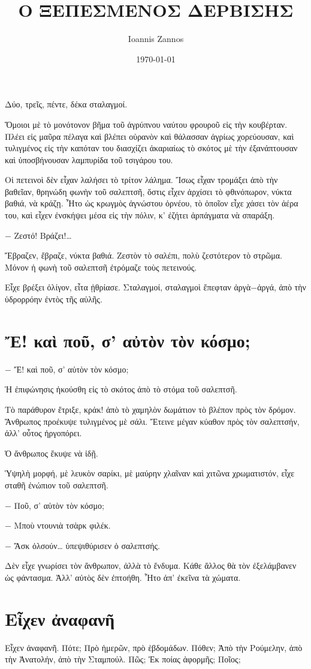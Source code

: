 \documentclass[11pt]{article}
\author{Ioannis Zannos}
\date{\today}
\title{Ο ΞΕΠΕΣΜΕΝΟΣ ΔΕΡΒΙΣΗΣ}
\begin{document}
\maketitle
\tableofcontents

Δύο, τρεῖς, πέντε, δέκα σταλαγμοί.

Ὅμοιοι μὲ τὸ μονότονον βῆμα τοῦ ἀγρύπνου ναύτου φρουροῦ εἰς τὴν κουβέρταν. Πλέει εἰς μαῦρα πέλαγα καὶ βλέπει οὐρανὸν καὶ θάλασσαν ἀγρίως χορεύουσαν, καὶ τυλιγμένος εἰς τὴν καπόταν του διασχίζει ἀκαριαίως τὸ σκότος μὲ τὴν ἐξανάπτουσαν καὶ ὑποσβήνουσαν λαμπυρίδα τοῦ τσιγάρου του.

Οἱ πετεινοὶ δὲν εἶχαν λαλήσει τὸ τρίτον λάλημα. Ἴσως εἶχαν τρομάξει ἀπὸ τὴν βαθεῖαν, θρηνώδη φωνὴν τοῦ σαλεπτσῆ, ὅστις εἶχεν ἀρχίσει τὸ φθινόπωρον, νύκτα βαθιά, νὰ κράζῃ. Ἦτο ὡς κρωγμὸς ἀγνώστου ὀρνέου, τὸ ὁποῖον εἶχε χάσει τὸν ἀέρα του, καὶ εἶχεν ἐνσκήψει μέσα εἰς τὴν πόλιν, κ' ἐζήτει ἁρπάγματα νὰ σπαράξη.

− Ζεστό! Βράζει!…

Ἔβραζεν, ἔβραζε, νύκτα βαθιά. Ζεστὸν τὸ σαλέπι, πολὺ ζεστότερον τὸ στρῶμα. Μόνον ἡ φωνὴ τοῦ σαλεπτσῆ ἐτρόμαζε τοὺς πετεινούς.

Εἶχε βρέξει ὀλίγον, εἶτα ᾐθρίασε. Σταλαγμοί, σταλαγμοὶ ἔπεφταν ἀργὰ−ἀργά, ἀπὸ τὴν ὑδρορρόην ἐντὸς τῆς αὐλῆς.

\section{Ἔ! καὶ ποῦ, σ' αὐτὸν τὸν κόσμο;}
\label{sec:org15ff479}
− Ἔ! καὶ ποῦ, σ' αὐτὸν τὸν κόσμο;

Ἡ ἐπιφώνησις ἠκούσθη εἰς τὸ σκότος ἀπὸ τὸ στόμα τοῦ σαλεπτσῆ.

Τὸ παράθυρον ἔτριξε, κράκ! ἀπὸ τὸ χαμηλὸν δωμάτιον τὸ βλέπον πρὸς τὸν δρόμον. Ἄνθρωπος προέκυψε τυλιγμένος μὲ σάλι. Ἔτεινε μέγαν κύαθον πρὸς τὸν σαλεπτσήν, ἀλλ' οὗτος ἠργοπόρει.

Ὁ ἄνθρωπος ἔκυψε νὰ ἰδῇ.

Ὑψηλὴ μορφή, μὲ λευκὸν σαρίκι, μὲ μαύρην χλαῖναν καὶ χιτῶνα χρωματιστόν, εἶχε σταθῆ ἐνώπιον τοῦ σαλεπτσῆ.

− Ποῦ, σ' αὐτὸν τὸν κόσμο;

− Μποὺ ντουνιὰ τσὰρκ φιλέκ.

− Ἄσκ ὀλσούν… ὑπεψιθύρισεν ὁ σαλεπτσής.

Δὲν εἶχε γνωρίσει τὸν ἄνθρωπον, ἀλλὰ τὸ ἔνδυμα. Κάθε ἄλλος θὰ τὸν ἐξελάμβανεν ὡς φάντασμα. Ἀλλ' αὐτὸς δὲν ἐπτοήθη. Ἦτο ἀπ' ἐκεῖνα τὰ χώματα.
\section{Εἶχεν ἀναφανῆ}
\label{sec:orgf789a10}
Εἶχεν ἀναφανῆ. Πότε; Πρὸ ἡμερῶν, πρὸ ἑβδομάδων. Πόθεν; Ἀπὸ τὴν Ρούμελην, ἀπὸ τὴν Ἀνατολήν, ἀπὸ τὴν Σταμπούλ. Πῶς; Ἐκ ποίας ἀφορμῆς; Ποῖος;
\end{document}
